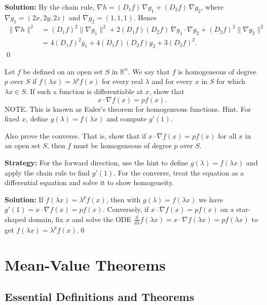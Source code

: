 \bigskip\noindent\textbf{Solution:}
By the chain rule, $\nabla h=(D_1 f)\,\nabla g_1+(D_2 f)\,\nabla g_2$, where $\nabla g_1=(2x,2y,2z)$ and $\nabla g_2=(1,1,1)$. Hence
\begin{align*}
\|\nabla h\|^2&=(D_1 f)^2\|\nabla g_1\|^2+2(D_1 f)(D_2 f)\,\nabla g_1\!\cdot\!\nabla g_2+(D_2 f)^2\|\nabla g_2\|^2\\
&=4(D_1 f)^2 g_1+4(D_1 f)(D_2 f) g_2+3(D_2 f)^2.
\end{align*}\qed


\begin{problembox}
\begin{problemstatement}
Let \( f \) be defined on an open set \( S \) in \( \mathbb{R}^n \). We say that \( f \) is homogeneous of degree \( p \) over \( S \) if \( f(\lambda x) = \lambda^p f(x) \) for every real \( \lambda \) and for every \( x \) in \( S \) for which \( \lambda x \in S \). If such a function is differentiable at \( x \), show that
\[x \cdot \nabla f(x) = p f(x).\]
NOTE. This is known as Euler's theorem for homogeneous functions. Hint. For fixed \( x \), define \( g(\lambda) = f(\lambda x) \) and compute \( g'(1) \).

Also prove the converse. That is, show that if \( x \cdot \nabla f(x) = p f(x) \) for all \( x \) in an open set \( S \), then \( f \) must be homogeneous of degree \( p \) over \( S \).
\end{problemstatement}
\end{problembox}

\noindent\textbf{Strategy:} For the forward direction, use the hint to define \( g(\lambda) = f(\lambda x) \) and apply the chain rule to find \( g'(1) \). For the converse, treat the equation as a differential equation and solve it to show homogeneity.

\bigskip\noindent\textbf{Solution:}
If $f(\lambda x)=\lambda^p f(x)$, then with $g(\lambda)=f(\lambda x)$ we have $g'(1)=x\cdot\nabla f(x)=p f(x)$. Conversely, if $x\cdot\nabla f(x)=p f(x)$ on a star-shaped domain, fix $x$ and solve the ODE $\tfrac{d}{d\lambda}f(\lambda x)=x\cdot\nabla f(\lambda x)=p f(\lambda x)$ to get $f(\lambda x)=\lambda^p f(x)$.\qed
\section{Mean-Value Theorems}

\subsection*{Essential Definitions and Theorems}

